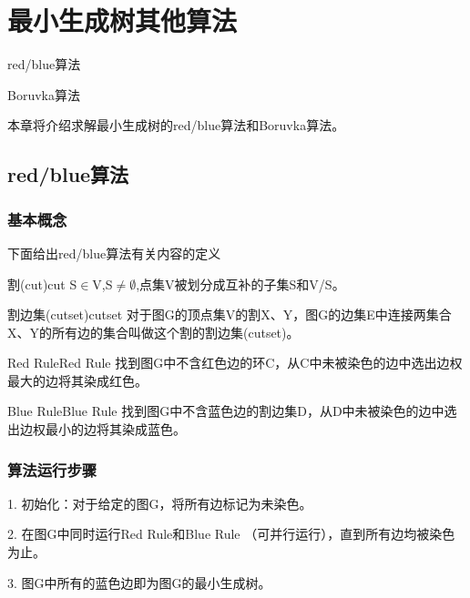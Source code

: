 \chapter{最小生成树其他算法}

\begin{introduction}
	\item red/blue算法
	\item Boruvka算法
\end{introduction}

本章将介绍求解最小生成树的red/blue算法和Boruvka算法。

\section{red/blue算法}

\subsection{基本概念}
下面给出red/blue算法有关内容的定义
\begin{definition}{割(cut)}{cut}
	S$\in$V,S$\neq \emptyset$,点集V被划分成互补的子集S和V/S。
\end{definition}

\begin{definition}{割边集(cutset)}{cutset}
    对于图G的顶点集V的割X、Y，图G的边集E中连接两集合X、Y的所有边的集合叫做这个割的割边集(cutset)。
\end{definition}

\begin{definition}{Red Rule}{Red Rule}
    找到图G中不含红色边的环C，从C中未被染色的边中选出边权最大的边将其染成红色。
\end{definition}

\begin{definition}{Blue Rule}{Blue Rule}
    找到图G中不含蓝色边的割边集D，从D中未被染色的边中选出边权最小的边将其染成蓝色。
\end{definition}

\subsection{算法运行步骤}
1. 初始化：对于给定的图G，将所有边标记为未染色。

2. 在图G中同时运行Red Rule和Blue Rule （可并行运行），直到所有边均被染色为止。

3. 图G中所有的蓝色边即为图G的最小生成树。

